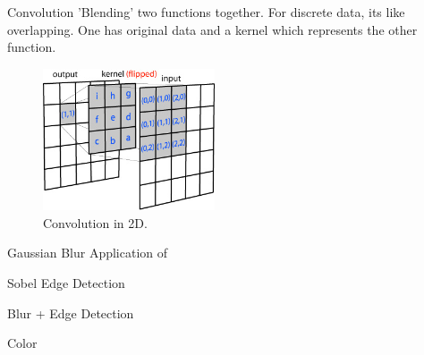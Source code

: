\documentclass{beamer}
\begin{document}
\begin{frame}{Convolution}
'Blending' two functions together. For discrete data, its like overlapping.
One has original data and a kernel which represents the other function. 
\begin{figure}[htp]
\centering
\includegraphics[width=2in]{conv2d_matrix.jpg}
\caption{Convolution in 2D.}
\label{}
\end{figure}
\end{frame}

\begin{frame}{Gaussian Blur}
Application of 

\end{frame}

\begin{frame}{Sobel Edge Detection}

\end {frame}

\begin{frame}{Blur + Edge Detection}

\end{frame}


\begin{frame}{Color}

\end{frame}
\end{document}
